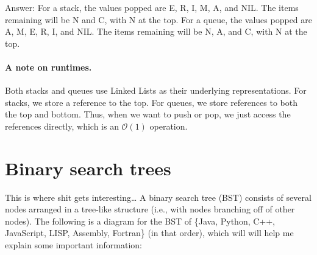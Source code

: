 \documentclass{pset_template}
\begin{document}
Answer: For a stack, the values popped are E, R, I, M, A, and NIL.
The items remaining will be N and C, with N at the top.
For a queue, the values popped are A, M, E, R, I, and NIL.
The items remaining will be N, A, and C, with N at the top.

\paragraph{A note on runtimes.}
Both stacks and queues use Linked Lists as their underlying representations.
For stacks, we store a reference to the top.
For queues, we store references to both the top and bottom.
Thus, when we want to push or pop, we just access the references directly,
which is an $\mathcal{O}(1)$ operation.


\section{Binary search trees}
This is where shit gets interesting\ldots
 A binary search tree (BST) consists of several nodes arranged in a tree-like
structure (i.e., with nodes branching off of other nodes).
The following is a diagram for the BST of \{Java, Python, C++, JavaScript,
LISP, Assembly, Fortran\} (in that order),
which will will help me explain some important information:
\begin{center}
\end{center}
\end{document}

